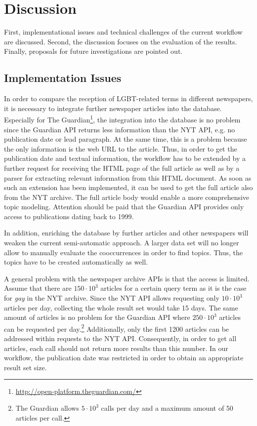 \documentclass[10pt,a4paper,twocolumn]{scrartcl}
\begin{document}
\section{Discussion}\label{sec:discussion}
First, implementational issues and technical challenges of the current workflow are discussed. Second, the discussion focuses on the evaluation of the results. Finally, proposals for future investigations are pointed out.

\subsection{Implementation Issues}
In order to compare the reception of LGBT-related terms in different newspapers, it is necessary to integrate further newspaper articles into the database. Especially for The Guardian\footnote{\url{http://open-platform.theguardian.com/}}, the integration into the database is no problem since the Guardian API returns less information than the NYT API, e.g. no publication date or lead paragraph. At the same time, this is a problem because the only information is the web URL to the article. Thus, in order to get the publication date and textual information, the workflow has to be extended by a further request for receiving the HTML page of the full article as well as by a parser for extracting relevant information from this HTML document. As soon as such an extension has been implemented, it can be used to get the full article also from the NYT archive. The full article body would enable a more comprehensive topic modeling. Attention should be paid that the Guardian API provides only access to publications dating back to 1999.

In addition, enriching the database by further articles and other newspapers will weaken the current semi-automatic approach. A larger data set will no longer allow to manually evaluate the cooccurrences in order to find topics. Thus, the topics have to be created automatically as well.

A general problem with the newspaper archive APIs is that the access is limited. Assume that there are $150 \cdot 10^3$ articles for a certain query term as it is the case for \textit{gay} in the NYT archive. Since the NYT API allows requesting only $10\cdot 10^3$ articles per day, collecting the whole result set would take 15 days. The same amount of articles is no problem for the Guardian API where $250\cdot 10^3$ articles can be requested per day.\footnote{The Guardian allows $5\cdot 10^3$ calls per day and a maximum amount of 50 articles per call.} Additionally, only the first 1200 articles can be addressed within requests to the NYT API. Consequently, in order to get all articles, each call should not return more results than this number. In our workflow, the publication date was restricted in order to obtain an appropriate result set size.
\end{document}
